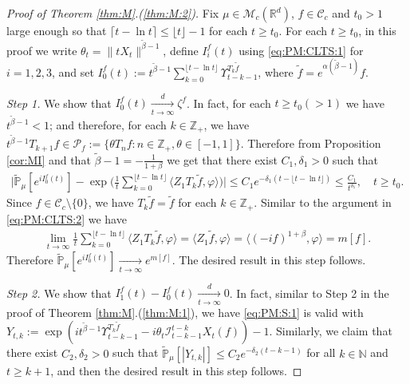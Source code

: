 \documentclass[EJP]{ejpecp} %
\begin{document}
\begin{proof}[Proof of Theorem \ref{thm:M}.(\ref{thm:M:2})]
  Fix $\mu\in \mathcal M_c(\mathbb R^d)$, $f\in \mathcal C_c$ and $t_0 > 1$ large enough so that $ \lceil t - \ln t\rceil \leq \lfloor t \rfloor - 1$ for each $t\geq t_0$.
  For each $t\geq t_0$, in this proof we write $\theta_t = \|t X_t\|^{\tilde \beta - 1}$,  define $I_i^f(t)$ using \eqref{eq:PM:CLTS:1}  for $i = 1,2,3$, and set $ I^f_0(t) := t^{\tilde \beta - 1}\sum_{k=0}^{\lfloor t-\ln t \rfloor} \Upsilon_{t-k-1}^{T_{k} \tilde f}$, where $\tilde f = e^{\alpha(\tilde \beta - 1)} f$.

  \emph{Step 1.} We show that $I^f_0(t) \xrightarrow[t\to \infty]{d} \zeta^f$.
  In fact, for each $t \geq  t_0( > 1)$ we have $t^{\tilde \beta - 1} < 1$; and therefore, for each $k \in \mathbb Z_+$, we have $t^{\tilde \beta - 1} T_{k+1} f \in \mathcal P_f:=\{\theta T_n f: n \in \mathbb Z_+, \theta \in [-1,1]\}$.
  Therefore from Proposition \ref{cor:MI} and that $\tilde \beta - 1 = -\frac{1}{1+\beta}$ we get that there exist $C_1,\delta_1 > 0$ such that
  \begin{align}
    \Big|\mathbb{\widetilde{P}}_{\mu} [e^{i I^f_0(t)} ]-\exp\Big(\frac{1}{t}\sum_{k=0}^{\lfloor t-\ln t \rfloor} \langle Z_1T_{k}\tilde f, \varphi\rangle \Big)\Big|
    \leq C_1 e^{-\delta_1(t - \lfloor t - \ln t\rfloor)}
    \leq \frac{C_1}{t^{\delta_1}},
    \quad t\geq t_0.
  \end{align}
  Since $f \in \mathcal C_c\setminus \{0\}$, we have $T_k \tilde f = \tilde f$ for each $k \in \mathbb Z_+$.
  Similar to the argument in \eqref{eq:PM:CLTS:2} we have
  \begin{align}
    \label{CLT:C:eq:m}
    \lim_{t\to \infty} \frac{1}{t}\sum_{k=0}^{\lfloor t-\ln t \rfloor} \langle Z_1 T_{k}\tilde f, \varphi\rangle
    = \langle Z_1 \tilde f,\varphi \rangle
    = \langle (-if)^{1+\beta}, \varphi \rangle
    = m[f].
  \end{align}
  Therefore $\mathbb {\widetilde P}_\mu[e^{i I^f_0(t)}] \xrightarrow[t\to \infty]{} e^{m[f]}$.
  The desired result in this step follows.

  \emph{Step 2.} We show that $ I^f_1(t) - I^f_0 (t) \xrightarrow[t\to \infty]{d} 0$.
  In fact, similar to Step 2 in the proof of Theorem \ref{thm:M}.(\ref{thm:M:1}), we  have \eqref{eq:PM:S:1} is valid with $ Y_{t,k} := \exp(i t^{\tilde \beta - 1} \Upsilon_{t-k-1}^{T_{k}\tilde f} - i\theta_t \mathcal I_{t-k-1}^{t-k} X_t(f)) - 1$.
  Similarly, we claim that there exist $C_2, \delta_2>0$ such that $\widetilde {\mathbb P}_\mu [|Y_{t,k}|] \leq C_2 e^{-\delta_2 (t-k-1)}$ for all $k\in \mathbb N$ and $t\geq k+1$, and  then the desired result in this step follows.


\end{proof}
\end{document}
